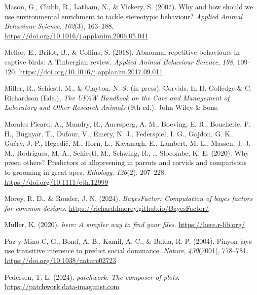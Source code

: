 \documentclass[
  pub]{apa6}
\newlength{\cslhangindent}
\newlength{\cslentryspacingunit} %
\newenvironment{CSLReferences}[2] %
 {%
  \setlength{\parindent}{0pt}
  \ifodd #1
  \let\oldpar\par
  \def\par{\hangindent=\cslhangindent\oldpar}
  \fi
  \setlength{\parskip}{#2\cslentryspacingunit}
 }%
 {}
\begin{document}
\begin{CSLReferences}{1}{0}
\leavevmode{}%
Mason, G., Clubb, R., Latham, N., \& Vickery, S. (2007). Why and how should we use environmental enrichment to tackle stereotypic behaviour? \emph{Applied Animal Behaviour Science}, \emph{102}(3), 163--188. \url{https://doi.org/10.1016/j.applanim.2006.05.041}

\leavevmode{}%
Mellor, E., Brilot, B., \& Collins, S. (2018). Abnormal repetitive behaviours in captive birds: A {Tinbergian} review. \emph{Applied Animal Behaviour Science}, \emph{198}, 109--120. \url{https://doi.org/10.1016/j.applanim.2017.09.011}

\leavevmode{}%
Miller, R., Schiestl, M., \& Clayton, N. S. (in press). Corvids. In H. Golledge \& C. Richardson (Eds.), \emph{The {UFAW Handbook} on the {Care} and {Management} of {Laboratory} and {Other Research Animals}} (9th ed.). {John Wiley \& Sons}.

\leavevmode{}%
Morales Picard, A., Mundry, R., Auersperg, A. M., Boeving, E. R., Boucherie, P. H., Bugnyar, T., Dufour, V., Emery, N. J., Federspiel, I. G., Gajdon, G. K., Guéry, J.-P., Hegedič, M., Horn, L., Kavanagh, E., Lambert, M. L., Massen, J. J. M., Rodrigues, M. A., Schiestl, M., Schwing, R., \ldots{} Slocombe, K. E. (2020). Why preen others? {Predictors} of allopreening in parrots and corvids and comparisons to grooming in great apes. \emph{Ethology}, \emph{126}(2), 207--228. \url{https://doi.org/10.1111/eth.12999}

\leavevmode{}%
Morey, R. D., \& Rouder, J. N. (2024). \emph{BayesFactor: Computation of bayes factors for common designs}. \url{https://richarddmorey.github.io/BayesFactor/}

\leavevmode{}%
Müller, K. (2020). \emph{{here}: A simpler way to find your files}. \url{https://here.r-lib.org/}

\leavevmode{}%
Paz-y-Mino C, G., Bond, A. B., Kamil, A. C., \& Balda, R. P. (2004). Pinyon jays use transitive inference to predict social dominance. \emph{Nature}, \emph{430}(7001), 778--781. \url{https://doi.org/10.1038/nature02723}

\leavevmode{}%
Pedersen, T. L. (2024). \emph{{patchwork}: The composer of plots}. \url{https://patchwork.data-imaginist.com}


\end{CSLReferences}
\end{document}
